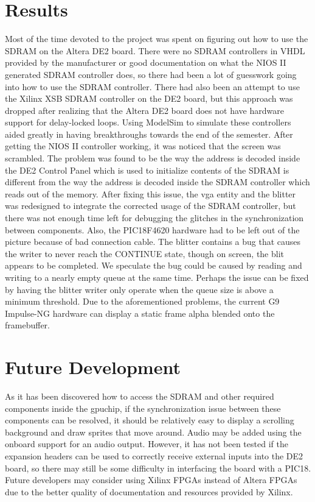 \documentclass{report}
\begin{document}
\newpage
\section{Results}
Most of the time devoted to the project was spent on figuring out how to 
use the SDRAM on the Altera DE2 board. There were no SDRAM controllers 
in VHDL provided by the manufacturer or good documentation on what the 
NIOS II generated SDRAM controller does, so there had been a lot of 
guesswork going into how to use the SDRAM controller. There had also 
been an attempt to use the Xilinx XSB SDRAM controller on the DE2 board, 
but this approach was dropped after realizing that the Altera DE2 board 
does not have hardware support for delay-locked loops. Using ModelSim to 
simulate these controllers aided greatly in having breakthroughs towards 
the end of the semester. After getting the NIOS II controller working, 
it was noticed that the screen was scrambled. The problem was found to 
be the way the address is decoded inside the DE2 Control Panel which is 
used to initialize contents of the SDRAM is different from the way the 
address is decoded inside the SDRAM controller which reads out of the 
memory. After fixing this issue, the vga entity and the blitter was redesigned to 
integrate the corrected usage of the SDRAM controller, but there was not enough time 
left for debugging the glitches in the synchronization between 
components. Also, the PIC18F4620 hardware had to be left out of the 
picture because of bad connection cable. The blitter contains a bug that 
causes the writer to never reach the CONTINUE state, though on screen, 
the blit appears to be completed. We speculate the bug could be caused 
by reading and writing to a nearly empty queue at the same time.  
Perhaps the issue can be fixed by having the blitter writer only operate 
when the queue size is above a minimum threshold. Due to the 
aforementioned problems, the current G9 Impulse-NG hardware can display 
a static frame alpha blended onto the framebuffer.

\section{Future Development}
As it has been discovered how to access the SDRAM and other required 
components inside the gpuchip, if the synchronization issue between 
these components can be resolved, it should be relatively easy to 
display a scrolling background and draw sprites that move around. Audio 
may be added using the onboard support for an audio output. However, it 
has not been tested if the expansion headers can be used to correctly 
receive external inputs into the DE2 board, so there may still be some 
difficulty in interfacing the board with a PIC18. Future developers may
consider using Xilinx FPGAs instead of Altera FPGAs due to the better 
quality of documentation and resources provided by Xilinx.

\clearpage
{}
{}
\nocite{website:dualport}
\nocite{website:dualport}
\nocite{website:XSA}
\nocite{website:XSB}
\nocite{website:DE2}
\nocite{website:Avalon}
\nocite{website:PLL}
\nocite{website:G9Impulse}
\nocite{website:Using}



\end{document}
